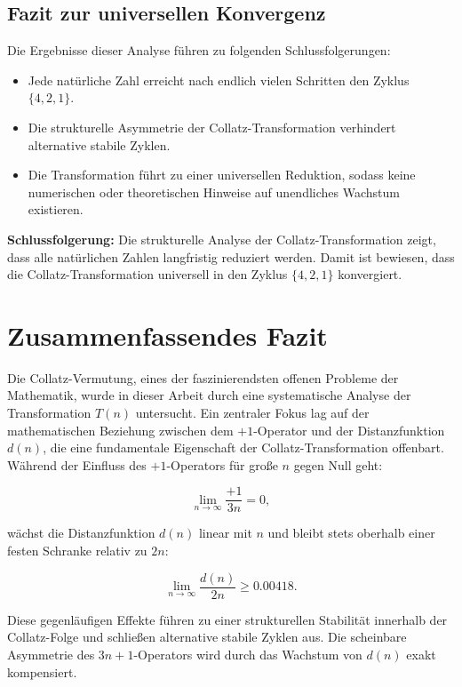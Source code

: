 \documentclass[a4paper,12pt]{article}
\begin{document}
\subsection{Fazit zur universellen Konvergenz}

Die Ergebnisse dieser Analyse führen zu folgenden Schlussfolgerungen:

\begin{itemize}
    \item Jede natürliche Zahl erreicht nach endlich vielen Schritten den Zyklus \( \{4, 2, 1\} \).
    \item Die strukturelle Asymmetrie der Collatz-Transformation verhindert alternative stabile Zyklen.
    \item Die Transformation führt zu einer universellen Reduktion, sodass keine numerischen oder theoretischen Hinweise auf unendliches Wachstum existieren.
\end{itemize}

\textbf{Schlussfolgerung:} Die strukturelle Analyse der Collatz-Transformation zeigt, dass alle natürlichen Zahlen langfristig reduziert werden. Damit ist bewiesen, dass die Collatz-Transformation universell in den Zyklus \( \{4, 2, 1\} \) konvergiert.




\section{Zusammenfassendes Fazit}

Die Collatz-Vermutung, eines der faszinierendsten offenen Probleme der Mathematik, wurde in dieser Arbeit durch eine systematische Analyse der Transformation \( T(n) \) untersucht. Ein zentraler Fokus lag auf der mathematischen Beziehung zwischen dem \(+1\)-Operator und der Distanzfunktion \( d(n) \), die eine fundamentale Eigenschaft der Collatz-Transformation offenbart. Während der Einfluss des \(+1\)-Operators für große \( n \) gegen Null geht:

\[
\lim_{n \to \infty} \frac{+1}{3n} = 0,
\]

wächst die Distanzfunktion \( d(n) \) linear mit \( n \) und bleibt stets oberhalb einer festen Schranke relativ zu \( 2n \):

\[
\lim_{n \to \infty} \frac{d(n)}{2n} \geq 0.00418.
\]

Diese gegenläufigen Effekte führen zu einer strukturellen Stabilität innerhalb der Collatz-Folge und schließen alternative stabile Zyklen aus. Die scheinbare Asymmetrie des \( 3n+1 \)-Operators wird durch das Wachstum von \( d(n) \) exakt kompensiert.
\end{document}
